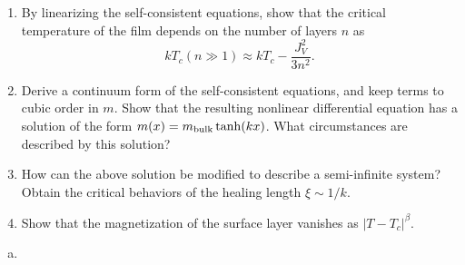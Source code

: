 \begin{problem}
\begin{enumerate}
        \item[(f)] By linearizing the self-consistent equations, show that the critical temperature of the film depends on the number of layers $n$ as
        \[
            kT_c(n\gg 1) \approx kT_c - \frac{J_V^2}{3n^2}.
        \]

        \item[(g)] Derive a continuum form of the self-consistent equations, and keep terms to cubic order in $m$. Show that the resulting nonlinear differential equation has a solution of the form $m(x) = m_{\rm bulk}\tanh(kx)$. What circumstances are described by this solution?

        \item[(h)] How can the above solution be modified to describe a semi-infinite system? Obtain the critical behaviors of the healing length $\xi \sim 1/k$.

        \item[(i)] Show that the magnetization of the surface layer vanishes as $|T - T_c|^\beta$.
    \end{enumerate}
\end{problem}

\begin{solution}
    \begin{enumerate}[(a)]
        \item
    \end{enumerate}
\end{solution}
